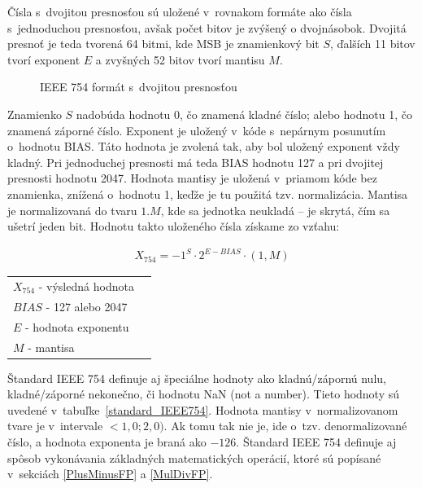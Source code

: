 Čísla s~dvojitou presnosťou sú uložené v~rovnakom formáte ako čísla s~jednoduchou presnosťou, avšak počet bitov je zvýšený o dvojnásobok. Dvojitá presnoť je teda tvorená 64 bitmi, kde MSB je znamienkový bit $ S $, ďalších 11 bitov tvorí exponent $ E $ a zvyšných 52 bitov tvorí mantisu $ M $.

\bigskip
\begin{figure}[h]
\centering
{}
\caption{IEEE 754 formát s~dvojitou presnosťou}
\label{formatFP64}
\end{figure}

Znamienko $ S $ nadobúda hodnotu 0, čo znamená kladné číslo; alebo hodnotu 1, čo znamená záporné číslo. Exponent je uložený v~kóde s~nepárnym posunutím o~hodnotu BIAS. Táto hodnota je zvolená tak, aby bol uložený exponent vždy kladný. Pri jednoduchej presnosti má teda BIAS hodnotu 127 a pri dvojitej presnosti hodnotu 2047.
\newpage
Hodnota mantisy je uložená v~priamom kóde bez znamienka, znížená o~hodnotu 1, keďže je tu použitá tzv. normalizácia. Mantisa je normalizovaná do tvaru $ 1.M $, kde sa jednotka neukladá -- je skrytá, čím sa ušetrí jeden bit. Hodnotu takto uloženého čísla získame zo vzťahu:

\begin{eqnarray}
X_{754} = -1^{S}\cdot 2^{E-BIAS}\cdot (1,M)
\end{eqnarray}

\begin{tabular}{ll}
$ X_{754} $ - výsledná hodnota \\
$ BIAS $ - 127 alebo 2047 \\
$ E $ - hodnota exponentu \\
$ M $ - mantisa \\
\end{tabular}
\bigskip

Štandard IEEE 754 definuje aj špeciálne hodnoty ako kladnú/zápornú nulu, kladné/záporné nekonečno, či hodnotu NaN (not a number). Tieto hodnoty sú uvedené v~tabuľke~\ref{standard_IEEE754}.
Hodnota mantisy v~normalizovanom tvare je v~intervale $ <1,0; 2,0) $. Ak tomu tak nie je, ide o~tzv. denormalizované číslo, a hodnota exponenta je braná ako $ -126 $. Štandard IEEE 754 definuje aj spôsob vykonávania základných matematických operácií, ktoré sú popísané v~sekciách \ref{PlusMinusFP} a \ref{MulDivFP}.

